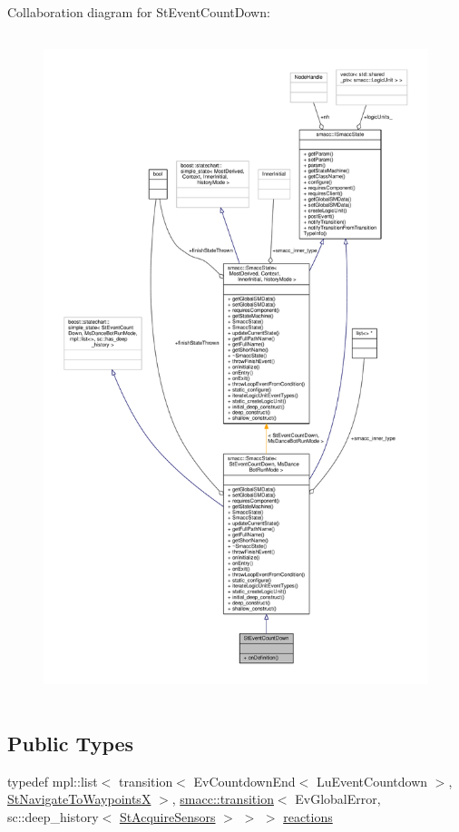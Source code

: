 Collaboration diagram for St\+Event\+Count\+Down\+:
\nopagebreak
\begin{figure}[H]
\begin{center}
\leavevmode
\includegraphics[height=550pt]{structStEventCountDown__coll__graph}
\end{center}
\end{figure}
\subsection*{Public Types}
\begin{DoxyCompactItemize}
\item 
typedef mpl\+::list$<$ transition$<$ Ev\+Countdown\+End$<$ Lu\+Event\+Countdown $>$, \hyperlink{structStNavigateToWaypointsX}{St\+Navigate\+To\+WaypointsX} $>$, \hyperlink{classsmacc_1_1transition}{smacc\+::transition}$<$ Ev\+Global\+Error, sc\+::deep\+\_\+history$<$ \hyperlink{structStAcquireSensors}{St\+Acquire\+Sensors} $>$ $>$ $>$ \hyperlink{structStEventCountDown_a6cbed99d43a19cad677e33c60f4cfdfc}{reactions}
\end{DoxyCompactItemize}
